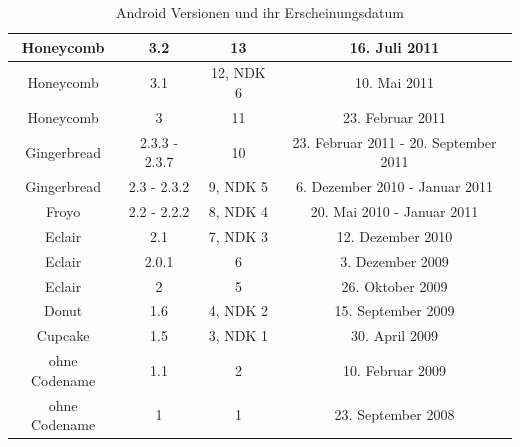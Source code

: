 \begin{table}[htbp]
{\begin{tabular}{|c|c|c|c|}
			Honeycomb                                & 3.2                                   & 13                                        & 16. Juli 2011                                     \\ \hline
			Honeycomb                                & 3.1                                     & 12, NDK 6                                 & 10. Mai 2011                                      \\ \hline
			Honeycomb                                & 3                                       & 11                                        & 23. Februar 2011                                  \\ \hline
			Gingerbread                              & 2.3.3 - 2.3.7                           & 10                                        & 23. Februar 2011 - 20. September 2011             \\ \hline
			Gingerbread                              & 2.3 - 2.3.2                             & 9, NDK 5                                  & 6. Dezember 2010 - Januar 2011                    \\ \hline
			Froyo                                    & 2.2 - 2.2.2                             & 8, NDK 4                                  & 20. Mai 2010 - Januar 2011                        \\ \hline
			Eclair                                   & 2.1                                     & 7, NDK 3                                  & 12. Dezember 2010                                 \\ \hline
			Eclair                                   & 2.0.1                                   & 6                                         & 3. Dezember 2009                                  \\ \hline
			Eclair                                   & 2                                       & 5                                         & 26. Oktober 2009                                  \\ \hline
			Donut                                    & 1.6                                     & 4, NDK 2                                  & 15. September 2009                                \\ \hline
			Cupcake                                  & 1.5                                     & 3, NDK 1                                  & 30. April 2009                                    \\ \hline
			ohne Codename                            & 1.1                                     & 2                                         & 10. Februar 2009                                  \\ \hline
			ohne Codename                            & 1                                       & 1                                         & 23. September 2008                                \\ \hline
		\end{tabular}
	}
	\caption{Android Versionen und ihr Erscheinungsdatum}\label{tab_android_vers}\citep{android_codenames,android_version_releases}
\end{table}
\clearpage

